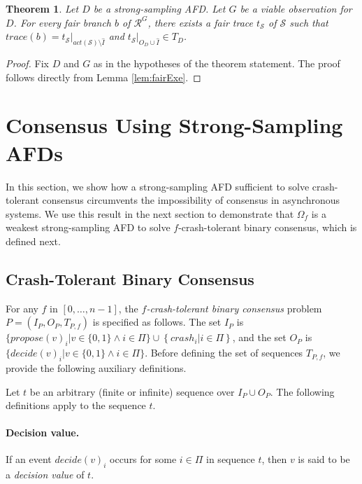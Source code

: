 \documentclass[11pt]{article}
\newtheorem{theorem}{Theorem}
\numberwithin{theorem}{section}
\newcommand{\set}[1]{\left\{#1\right\}}
\begin{document}
\begin{theorem}\label{thm:fairBranchFairExec}
Let $D$ be a strong-sampling AFD. Let $G$ be a viable observation for $D$.
For every fair branch $b$ of $\mathcal{R}^{G}$, there exists a fair
trace $t_{\mathcal{S}}$ of $\mathcal{S}$ such that $trace(b) = t_{\mathcal{S}}|_{act(\mathcal{S}) \setminus \hat{I}}$ and $t_{\mathcal{S}}|_{O_D \cup \hat{I}} \in T_D$.
\end{theorem}



\begin{proof}
 Fix $D$ and $G$ as in the hypotheses of the theorem statement. The proof follows directly from Lemma \ref{lem:fairExe}.
\end{proof}




\section{Consensus Using Strong-Sampling AFDs}
\label{sec:consensusAndAFD}



In this section, we show how a strong-sampling AFD sufficient to solve 
crash-tolerant  consensus circumvents the impossibility of consensus
in asynchronous systems. We use this result in the next section to
demonstrate that $\Omega_f$ is a weakest strong-sampling AFD to
solve $f$-crash-tolerant binary consensus, which is defined next.



\subsection{Crash-Tolerant Binary Consensus}
\label{subsec:consensusDef} 

For any $f$  in $[0,\ldots,n-1]$, the \emph{$f$-crash-tolerant binary consensus} problem $P =(I_P,O_P,T_{P,f})$ is specified as follows. The set $I_P$ is $\{ propose(v)_i| v \in \{0,1\} \wedge i \in\Pi\} \cup \set{crash_i | i \in\Pi}$, and the set $O_P$ is $\{ decide(v)_i | v \in \{0,1\} \wedge i \in\Pi\}$. Before defining the set of sequences $T_{P,f}$, we provide the following auxiliary definitions. 

Let $t$ be an arbitrary (finite or infinite) sequence over $I_P \cup O_P$. The following definitions apply to the sequence $t$. 

\paragraph{Decision value.} If an event $decide(v)_i$ occurs for some $i\in\Pi$ in sequence $t$, then $v$ is said to be a \emph{decision value} of $t$. 
\end{document}
